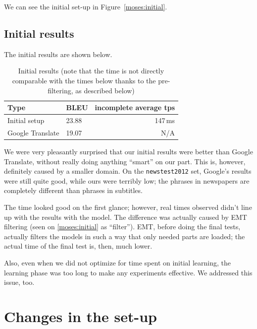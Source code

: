 We can see the initial set-up in Figure~\ref{moses:initial}.
\subsection{Initial results}

The initial results are shown below.

\begin{table}[h]
\begin{center}
\begin{tabular}{|l|l|r|}
    \hline
    \textbf{Type} & \textbf{BLEU} & \textbf{incomplete average tps} \\ \hline
    Initial setup & 23.88 & 147\,ms \\ \hline
    Google Translate & 19.07 & N/A \\  \hline
\end{tabular}
\end{center}

\caption{Initial results (note that the time is not directly comparable with the times below thanks to the pre-filtering, as described below)}\label{moses:initialresults}
\end{table}

We were very pleasantly surprised that our initial results were better than Google Translate, without really doing anything ``smart'' on our part. This is, however, definitely caused by a smaller domain. On the \texttt{newstest2012} set, Google's results were still quite good, while ours were terribly low; the phrases in newspapers are completely different than phrases in subtitles.

The time looked good on the first glance; however, real times observed didn't line up with the results with the model. The difference was actually caused by EMT filtering (seen on \ref{moses:initial} as ``filter''). EMT, before doing the final tests, actually filters the models in such a way that only needed parts are loaded; the actual time of the final test is, then, much lower.

Also, even when we did not optimize for time spent on initial learning, the learning phase was too long to make any experiments effective. We addressed this issue, too.

\section{Changes in the set-up}
